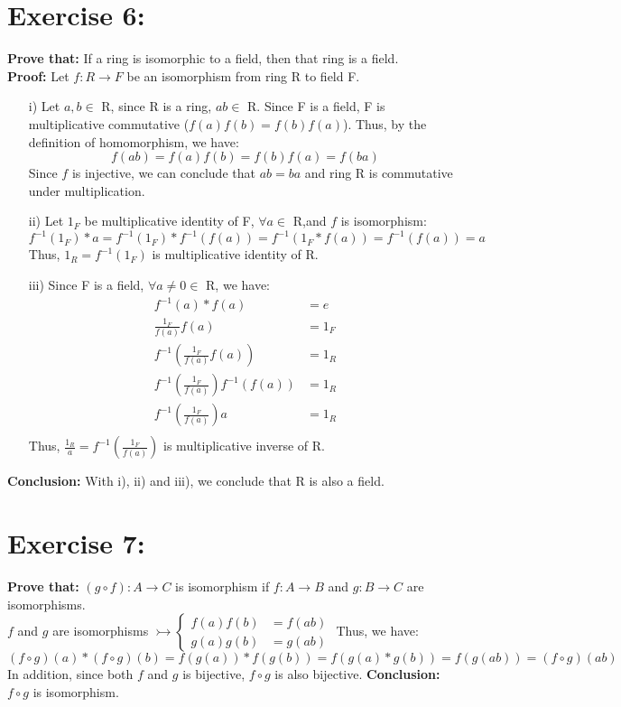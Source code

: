 \documentclass{article}
\begin{document}
	\section{Exercise 6:}
		\textbf{Prove that:} If a ring is isomorphic to a field, then that ring is a field.\\
		\textbf{Proof:} Let $f: R \rightarrow F$ be an isomorphism from ring R to field F.
		\begin{enumerate}
			\item [i)]
				Let $a, b \in$ R, since R is a ring, $ab \in$ R. Since F is a field, F is multiplicative commutative ($f(a)f(b)=f(b)f(a)$). Thus, by the definition of homomorphism, we have:
				\begin{equation*}
					f(ab) = f(a)f(b) = f(b)f(a) = f(ba)
				\end{equation*}
				Since $f$ is injective, we can conclude that $ab = ba$ and ring R is commutative under multiplication.\\
			\item [ii)]
				Let $1_F$ be multiplicative identity of F, $\forall a \in$ R,and $f$ is isomorphism:
				\begin{equation*}
					f^{-1}(1_F)*a = f^{-1}(1_F)*f^{-1}(f(a)) = f^{-1}(1_F*f(a)) = f^{-1}(f(a)) = a
				\end{equation*}
				Thus, $1_R = f^{-1}(1_F)$ is multiplicative identity of R.
			\item [iii)]
				Since F is a field, $\forall a \neq 0 \in$ R, we have:
				\begin{align*}
					f^{-1}(a) * f(a) &= e\\
					\frac{1_F}{f(a)}f(a) &= 1_F\\
					f^{-1}\left(\frac{1_F}{f(a)}f(a)\right) &= 1_R\\
					f^{-1}\left(\frac{1_F}{f(a)}\right)f^{-1}(f(a)) &= 1_R\\
					f^{-1}\left(\frac{1_F}{f(a)}\right)a &= 1_R\\
				\end{align*}
				Thus, $\frac{1_R}{a} = f^{-1}\left(\frac{1_F}{f(a)}\right)$ is multiplicative inverse of R.
		\end{enumerate}
		\textbf{Conclusion:} With i), ii) and iii), we conclude that R is also a field.
	
	\section{Exercise 7:}
		\textbf{Prove that:} $(g \circ f) : A \rightarrow C$ is isomorphism if $f: A \rightarrow B$ and $g: B \rightarrow C$ are isomorphisms.\\
		$f$ and $g$ are isomorphisms $\rightarrowtail
		\begin{cases}
			f(a)f(b) &= f(ab)\\
			g(a)g(b) &= g(ab)
		\end{cases}$ 
		Thus, we have:
		\begin{equation*}
		(f \circ g)(a) * (f \circ g)(b) = f(g(a))*f(g(b)) = f(g(a)*g(b)) = f(g(ab)) = (f \circ g)(ab)
		\end{equation*}
		In addition, since both $f$ and $g$ is bijective, $f \circ g$ is also bijective.
		\textbf{Conclusion:} $f \circ g$ is isomorphism.
\end{document}

